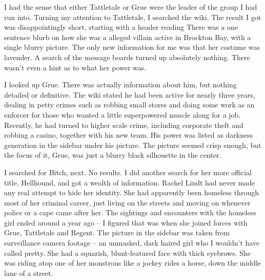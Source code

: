 I had the sense that either Tattletale or Grue were the leader of the group I had run into. Turning my attention to Tattletale, I searched the wiki. The result I got was disappointingly short, starting with a header reading  There was a one sentence blurb on how she was a alleged villain active in Brockton Bay, with a single blurry picture. The only new information for me was that her costume was lavender. A search of the message boards turned up absolutely nothing. There wasn't even a hint as to what her power was.

I looked up Grue. There was actually information about him, but nothing detailed or definitive. The wiki stated he had been active for nearly three years, dealing in petty crimes such as robbing small stores and doing some work as an enforcer for those who wanted a little superpowered muscle along for a job. Recently, he had turned to higher scale crime, including corporate theft and robbing a casino, together with his new team. His power was listed as darkness generation in the sidebar under his picture. The picture seemed crisp enough, but the focus of it, Grue, was just a blurry black silhouette in the center.

I searched for Bitch, next. No results. I did another search for her more official title, Hellhound, and got a wealth of information. Rachel Lindt had never made any real attempt to hide her identity. She had apparently been homeless through most of her criminal career, just living on the streets and moving on whenever police or a cape came after her. The sightings and encounters with the homeless girl ended around a year ago -- I figured that was when she joined forces with Grue, Tattletale and Regent. The picture in the sidebar was taken from surveillance camera footage -- an unmasked, dark haired girl who I wouldn't have called pretty. She had a squarish, blunt-featured face with thick eyebrows. She was riding atop one of her monstrous  like a jockey rides a horse, down the middle lane of a street.

